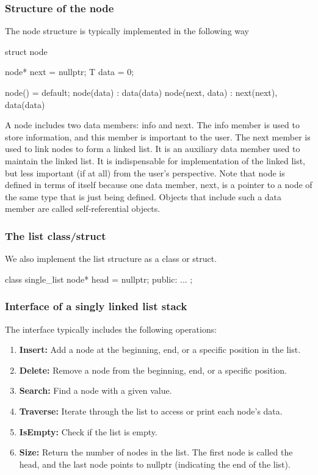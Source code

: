 \documentclass{report}
\begin{document}
    \subsubsection{Structure of the node}
    \bigbreak \noindent 
    The node structure is typically implemented in the following way
    \bigbreak \noindent 
    \begin{cppcode}
        struct node {
            node* next = nullptr;
            T data = 0; 

            node() = default;
            node(data) : data(data) {}
            node(next, data) : next(next), data(data) {}
        }
    \end{cppcode}
    \bigbreak \noindent 
    A node includes two data members: info and next. The info member is used
    to store information, and this member is important to the user. The next member is
    used to link nodes to form a linked list. It is an auxiliary data member used to maintain the linked list. It is indispensable for implementation of the linked list, but less
    important (if at all) from the user’s perspective. Note that node is defined
    in terms of itself because one data member, next, is a pointer to a node of the same
    type that is just being defined. Objects that include such a data member are called
    self-referential objects.

    \bigbreak \noindent 
    \subsubsection{The list class/struct}
    \bigbreak \noindent 
    We also implement the list structure as a class or struct.
    \bigbreak \noindent 
    \begin{cppcode}
        class single_list {
            node* head = nullptr;
        public:
            ...
        };
    \end{cppcode}


    \bigbreak \noindent 
    \subsubsection{Interface of a singly linked list stack}
    \bigbreak \noindent 
    The interface typically includes the following operations:
    \begin{enumerate}
        \item \textbf{Insert:} Add a node at the beginning, end, or a specific position in the list.
        \item \textbf{Delete:} Remove a node from the beginning, end, or a specific position.
        \item \textbf{Search:} Find a node with a given value.
        \item \textbf{Traverse:} Iterate through the list to access or print each node's data.
        \item \textbf{IsEmpty:} Check if the list is empty.
        \item \textbf{Size:} Return the number of nodes in the list. The first node is called the head, and the last node points to nullptr (indicating the end of the list).
    \end{enumerate}
\end{document}
